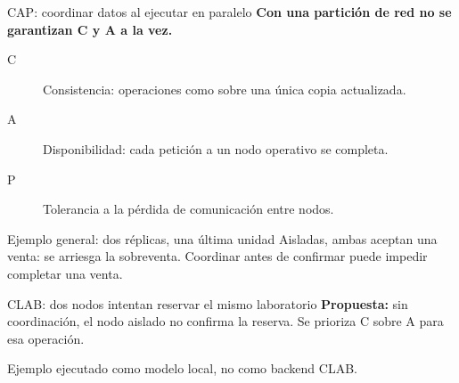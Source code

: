 \renewcommand{\fuentespie}{Fuentes: \cite{gsGilbertLynch2002,gsClabE1}}
\begin{frame}[label=gs-cap]{CAP: coordinar datos al ejecutar en paralelo}
  \small
  \textbf{Con una partición de red no se garantizan C y A a la vez.}
  \begin{description}
    \item[C] Consistencia: operaciones como sobre una única copia actualizada.
    \item[A] Disponibilidad: cada petición a un nodo operativo se completa.
    \item[P] Tolerancia a la pérdida de comunicación entre nodos.
  \end{description}
  \begin{block}{Ejemplo general: dos réplicas, una última unidad}
    Aisladas, ambas aceptan una venta: se arriesga la sobreventa.
    Coordinar antes de confirmar puede impedir completar una venta.
  \end{block}
  \begin{block}{CLAB: dos nodos intentan reservar el mismo laboratorio}
    \textbf{Propuesta:} sin coordinación, el nodo aislado no confirma
    la reserva. Se prioriza C sobre A para esa operación.
  \end{block}
  {\scriptsize Ejemplo ejecutado como modelo local, no como backend CLAB.
  \hyperlink{gs-evidencia-general}{}}
\end{frame}
\renewcommand{\fuentespie}{Fuentes: [PENDIENTE]}


